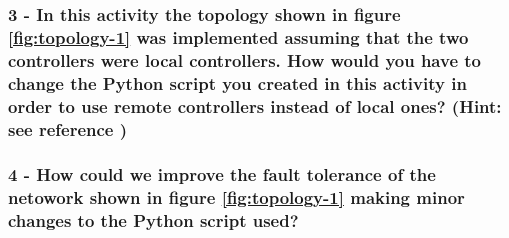 \hrulefill

\hrulefill

\hrulefill



\subsubsection*{3 - In this activity the topology shown in figure \ref{fig:topology-1}
was implemented assuming that the two controllers were local controllers. How would
you have to change the Python script you created in this activity in order
to use remote controllers instead of local ones? (Hint: see reference \parencite{ref-5})}
\hrulefill

\hrulefill

\hrulefill

\hrulefill



\subsubsection*{4 - How could we improve the fault tolerance of the netowork shown
in figure \ref{fig:topology-1} making minor changes to the Python script used?}
\hrulefill

\hrulefill

\hrulefill

\hrulefill




